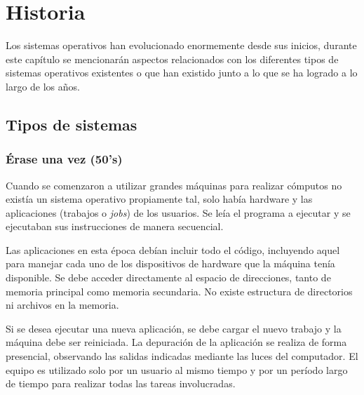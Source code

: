 %
%
%
%

\chapter{Historia}
\label{historia}
Los sistemas operativos han evolucionado enormemente desde sus inicios, durante
este capítulo se mencionarán aspectos relacionados con los diferentes tipos de
sistemas operativos existentes o que han existido junto a lo que se ha logrado a
lo largo de los años.

\section{Tipos de sistemas}

\subsection{Érase una vez (50's)}
Cuando se comenzaron a utilizar grandes máquinas para realizar cómputos no
existía un sistema operativo propiamente tal, solo había hardware y las
aplicaciones (trabajos o \textit{jobs}) de los usuarios. Se leía el programa a
ejecutar y se ejecutaban sus instrucciones de manera secuencial.

Las aplicaciones en esta época debían incluir todo el código, incluyendo aquel
para manejar cada uno de los dispositivos de hardware que la máquina tenía
disponible. Se debe acceder directamente al espacio de direcciones, tanto de
memoria principal como memoria secundaria. No existe estructura de directorios
ni archivos en la memoria.

Si se desea ejecutar una nueva aplicación, se debe cargar el nuevo trabajo y la
máquina debe ser reiniciada. La depuración de la aplicación se realiza de forma
presencial, observando las salidas indicadas mediante las luces del computador.
El equipo es utilizado solo por un usuario al mismo tiempo y por un período
largo de tiempo para realizar todas las tareas involucradas.

